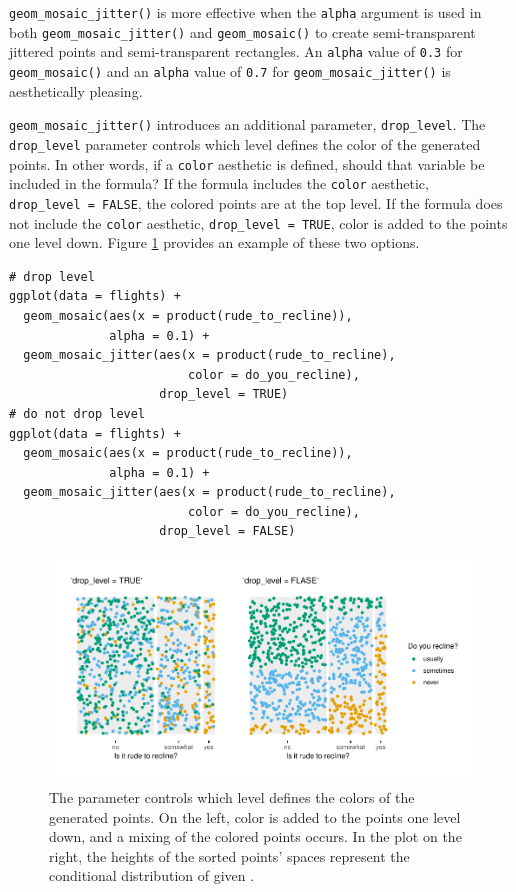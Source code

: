 \texttt{geom\_mosaic\_jitter()} is more effective when the \texttt{alpha} argument is used in both \texttt{geom\_mosaic\_jitter()} and \texttt{geom\_mosaic()} to create semi-transparent jittered points and semi-transparent rectangles. An \texttt{alpha} value of \texttt{0.3} for \texttt{geom\_mosaic()} and an \texttt{alpha} value of \texttt{0.7} for \texttt{geom\_mosaic\_jitter()} is aesthetically pleasing.

\texttt{geom\_mosaic\_jitter()} introduces an additional parameter, \texttt{drop\_level}. The \texttt{drop\_level} parameter controls which level defines the color of the generated points. In other words, if a \texttt{color} aesthetic is defined, should that variable be included in the formula? If the formula includes the \texttt{color} aesthetic, \texttt{drop\_level\ =\ FALSE}, the colored points are at the top level. If the formula does not include the \texttt{color} aesthetic, \texttt{drop\_level\ =\ TRUE}, color is added to the points one level down. Figure \ref{fig:leveldown} provides an example of these two options.

\begin{verbatim}
# drop level
ggplot(data = flights) +
  geom_mosaic(aes(x = product(rude_to_recline)), 
              alpha = 0.1) +
  geom_mosaic_jitter(aes(x = product(rude_to_recline), 
                         color = do_you_recline),
                     drop_level = TRUE)
# do not drop level
ggplot(data = flights) +
  geom_mosaic(aes(x = product(rude_to_recline)), 
              alpha = 0.1) +
  geom_mosaic_jitter(aes(x = product(rude_to_recline), 
                         color = do_you_recline),
                     drop_level = FALSE)
\end{verbatim}

\begin{figure}

{\centering \includegraphics[width=1\linewidth]{jeppson-hofmann_files/figure-latex/leveldown-1} 

}

\caption{The parameter  controls which level defines the colors of the generated points. On the left, color is added to the points one level down, and a mixing of the colored points occurs. In the plot on the right, the heights of the sorted points' spaces represent the conditional distribution of  given . }\label{fig:leveldown}
\end{figure}

